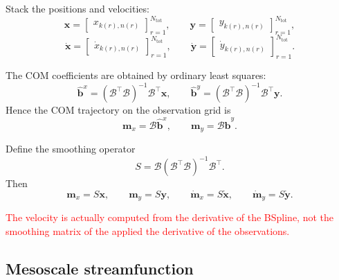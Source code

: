 \documentclass{article}
\begin{document}
Stack the positions and velocities:
\begin{equation}
\mathbf{x}=
\begin{bmatrix}
x_{k(r),n(r)}
\end{bmatrix}_{r=1}^{N_{\mathrm{tot}}},
\qquad
\mathbf{y}=
\begin{bmatrix}
y_{k(r),n(r)}
\end{bmatrix}_{r=1}^{N_{\mathrm{tot}}},
\end{equation}
\begin{equation}
\dot{\mathbf{x}}=
\begin{bmatrix}
\dot{x}_{k(r),n(r)}
\end{bmatrix}_{r=1}^{N_{\mathrm{tot}}},
\qquad
\dot{\mathbf{y}}=
\begin{bmatrix}
\dot{y}_{k(r),n(r)}
\end{bmatrix}_{r=1}^{N_{\mathrm{tot}}}.
\end{equation}

The COM coefficients are obtained by ordinary least squares:
\begin{equation}
\hat{\mathbf{b}}^x=(\mathcal{B}^{\top}\mathcal{B})^{-1}\mathcal{B}^{\top}\mathbf{x},
\qquad
\hat{\mathbf{b}}^y=(\mathcal{B}^{\top}\mathcal{B})^{-1}\mathcal{B}^{\top}\mathbf{y}.
\end{equation}
Hence the COM trajectory on the observation grid is
\begin{equation}
\mathbf{m}_x=\mathcal{B}\hat{\mathbf{b}}^x,
\qquad
\mathbf{m}_y=\mathcal{B}\hat{\mathbf{b}}^y.
\end{equation}

Define the smoothing operator
\begin{equation}
S=\mathcal{B}(\mathcal{B}^{\top}\mathcal{B})^{-1}\mathcal{B}^{\top}.
\label{eq:S_operator}
\end{equation}
Then
\begin{equation}
\mathbf{m}_x=S\mathbf{x},
\qquad
\mathbf{m}_y=S\mathbf{y},
\qquad
\dot{\mathbf{m}}_x=S\dot{\mathbf{x}},
\qquad
\dot{\mathbf{m}}_y=S\dot{\mathbf{y}}.
\label{eq:S_com_relation}
\end{equation}

\textcolor{red}{The velocity is actually computed from the derivative of the BSpline, not the smoothing matrix of the applied the derivative of the observations.}

\subsection{Mesoscale streamfunction}
\end{document}
